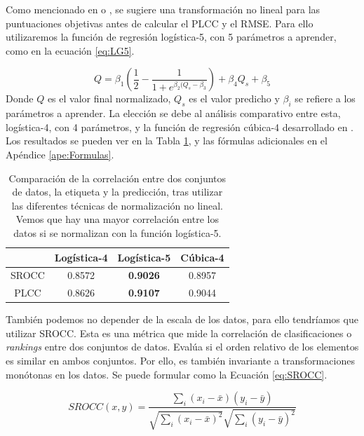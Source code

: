 Como mencionado en \cite{ResSCNN} o \cite{VQA-PC}, se sugiere una transformación 
no lineal para las puntuaciones objetivas antes de calcular el PLCC y el RMSE.
Para ello utilizaremos la función de regresión logística-5, con 5 parámetros a aprender,
como en la ecuación \eqref{eq:LG5}. 

\begin{equation}
  Q = \beta_1 \left(\frac{1}{2} - \frac{1}{1+e^{\beta_2 (Q_s-\beta_3}} \right) + \beta_4 Q_s + \beta_5
  \label{eq:LG5}
\end{equation}
Donde $Q$ es el valor final normalizado, $Q_s$ es el valor predicho y $\beta_i$ se 
refiere a los parámetros a aprender.
La elección se debe al análisis comparativo entre esta, logística-4, con 4 parámetros, y la función de regresión cúbica-4
desarrollado en \cite{ResSCNN}. Los resultados se pueden ver en la Tabla \ref{tab:CompareNonLineal}, 
y las fórmulas adicionales en el Apéndice \ref{ape:Formulas}.

\begin{table}[htp]
  \centering
  \scriptsize
  \begin{tabular}{|c|c|c|c|}
    \hline
    \rowcolor[HTML]{FFC702} 
    & \textbf{Logística-4} & \textbf{Logística-5} & \textbf{Cúbica-4} \\
    \hline 
    SROCC & 0.8572 & \textbf{0.9026} & 0.8957\\
    \hline
    PLCC & 0.8626 & \textbf{0.9107} & 0.9044 \\
    \hline 
  \end{tabular}
\caption[Comparativa entre funciones de normalización.]{Comparación de la correlación entre dos conjuntos de datos, la etiqueta y 
  la predicción, tras utilizar las diferentes técnicas de normalización no lineal. 
Vemos que hay una mayor correlación entre los datos si se normalizan con la 
función logística-5.}
  \label{tab:CompareNonLineal}
\end{table}
También podemos no depender de la escala de los datos, para ello tendríamos que 
utilizar SROCC.
Esta es una métrica que mide la correlación de clasificaciones o \emph{rankings} entre 
dos conjuntos de datos. Evalúa si el orden relativo de los elementos es similar 
en ambos conjuntos. Por ello, es también invariante a transformaciones monótonas 
en los datos. Se puede formular como la Ecuación \ref{eq:SROCC}.

\begin{equation}
  SROCC(x,y) = \frac{\sum_i (x_i - \bar x)(y_i - \bar y)}{\sqrt{\sum_i (x_i - \bar x)^2}\sqrt{\sum_i (y_i - \bar y)^2}}
\label{eq:SROCC}
\end{equation}

